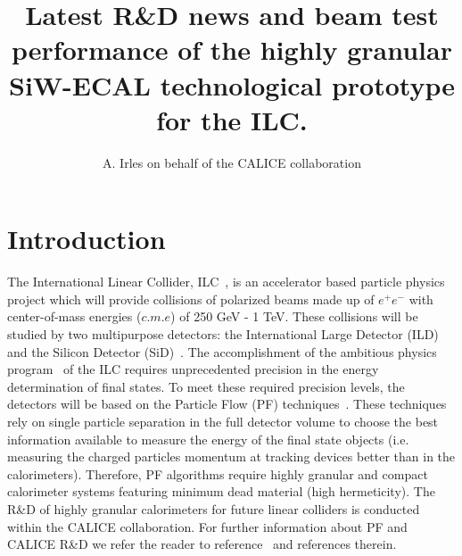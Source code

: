 \documentclass[a4paper,11pt]{article}
\title{\boldmath Latest R\&D news and beam test performance of the highly granular SiW-ECAL technological prototype for the ILC.}
\author[a]{A. Irles\note{Corresponding author.} on behalf of the CALICE collaboration}
\affiliation[a]{Laboratoire de l'Acc\'el\'erateur Lin\'eaire, Centre Scientifique d'Orsay, Universit\'e de Paris-Sud XI, CNRS/IN2P3, F-91898 Orsay Cedex, France}
\begin{document}
\maketitle
\flushbottom


\section{Introduction}

The International Linear Collider, ILC~\cite{Behnke:2013xla}, is an accelerator based particle physics project
which will provide collisions of polarized beams made up of $e^{+}e^{-}$ with center-of-mass energies ($c.m.e$) of 250 GeV - 1 TeV.
These collisions will be studied by two multipurpose detectors:
the International Large Detector (ILD) and the Silicon Detector (SiD)~\cite{Behnke:2013lya}.
The accomplishment of the ambitious physics program~\cite{Baer:2013cma,Fujii:2017vwa} of the ILC requires
unprecedented precision in the energy determination of final states.
To meet these required precision levels, the detectors will be based on the Particle Flow (PF) techniques~\cite{Brient:2002gh,Morgunov:2004ed}.
These techniques rely on single particle separation in the full detector volume to choose the best information available
to measure the energy of the final state objects (i.e. measuring the charged particles momentum at tracking devices better than in the calorimeters).
Therefore, PF algorithms require highly granular and compact calorimeter systems featuring minimum dead material (high hermeticity).
The R\&D of highly granular calorimeters for future linear colliders is conducted within the CALICE collaboration.%
For further information about PF and CALICE R\&D we refer the reader to reference~\cite{Sefkow:2015hna} and references therein.
\end{document}
